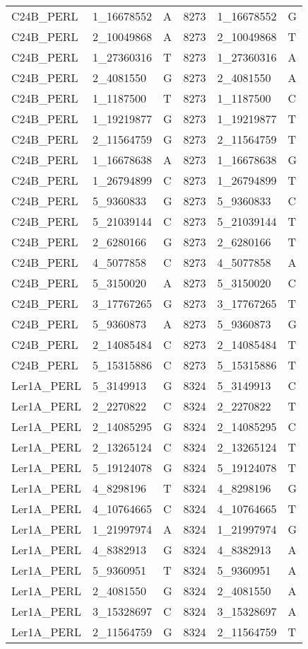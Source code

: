 \begin{center}
\begin{longtable}{|l|l|l|l|l|l|}
C24B\_PERL&1\_16678552&A&8273&1\_16678552&G\\
C24B\_PERL&2\_10049868&A&8273&2\_10049868&T\\
C24B\_PERL&1\_27360316&T&8273&1\_27360316&A\\
C24B\_PERL&2\_4081550&G&8273&2\_4081550&A\\
C24B\_PERL&1\_1187500&T&8273&1\_1187500&C\\
C24B\_PERL&1\_19219877&G&8273&1\_19219877&T\\
C24B\_PERL&2\_11564759&G&8273&2\_11564759&T\\
C24B\_PERL&1\_16678638&A&8273&1\_16678638&G\\
C24B\_PERL&1\_26794899&C&8273&1\_26794899&T\\
C24B\_PERL&5\_9360833&G&8273&5\_9360833&C\\
C24B\_PERL&5\_21039144&C&8273&5\_21039144&T\\
C24B\_PERL&2\_6280166&G&8273&2\_6280166&T\\
C24B\_PERL&4\_5077858&C&8273&4\_5077858&A\\
C24B\_PERL&5\_3150020&A&8273&5\_3150020&C\\
C24B\_PERL&3\_17767265&G&8273&3\_17767265&T\\
C24B\_PERL&5\_9360873&A&8273&5\_9360873&G\\
C24B\_PERL&2\_14085484&C&8273&2\_14085484&T\\
C24B\_PERL&5\_15315886&C&8273&5\_15315886&T\\
Ler1A\_PERL&5\_3149913&G&8324&5\_3149913&C\\
Ler1A\_PERL&2\_2270822&C&8324&2\_2270822&T\\
Ler1A\_PERL&2\_14085295&G&8324&2\_14085295&C\\
Ler1A\_PERL&2\_13265124&C&8324&2\_13265124&T\\
Ler1A\_PERL&5\_19124078&G&8324&5\_19124078&T\\
Ler1A\_PERL&4\_8298196&T&8324&4\_8298196&G\\
Ler1A\_PERL&4\_10764665&C&8324&4\_10764665&T\\
Ler1A\_PERL&1\_21997974&A&8324&1\_21997974&G\\
Ler1A\_PERL&4\_8382913&G&8324&4\_8382913&A\\
Ler1A\_PERL&5\_9360951&T&8324&5\_9360951&A\\
Ler1A\_PERL&2\_4081550&G&8324&2\_4081550&A\\
Ler1A\_PERL&3\_15328697&C&8324&3\_15328697&A\\
Ler1A\_PERL&2\_11564759&G&8324&2\_11564759&T\\

\end{longtable}
\end{center}
